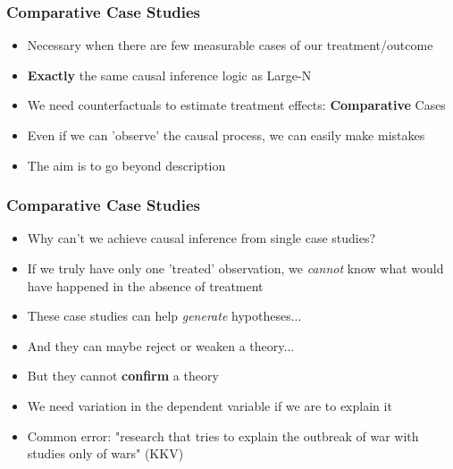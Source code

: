 \documentclass[xcolor=x11names,compress]{beamer}\usepackage[]{graphicx}\usepackage[]{color}
\renewcommand{\(}{\begin{columns}}
\renewcommand{\)}{\end{columns}}
\newcommand{\<}[1]{\begin{column}{#1}}
\renewcommand{\>}{\end{column}}
\begin{document}
\begin{frame}
\frametitle{Comparative Case Studies}
\begin{itemize}
\item Necessary when there are few measurable cases of our treatment/outcome
\pause
\item \textbf{Exactly} the same causal inference logic as Large-N
\pause
\item We need counterfactuals to estimate treatment effects: \textbf{Comparative} Cases
\pause
\item Even if we can 'observe' the causal process, we can easily make mistakes
\pause
\item The aim is to go beyond description
\end{itemize}
\end{frame}

\begin{frame}
\frametitle{Comparative Case Studies}
\begin{itemize}
\item Why can't we achieve causal inference from single case studies?
\pause
\item If we truly have only one 'treated' observation, we \textit{cannot} know what would have happened in the absence of treatment
\pause
\item These case studies can help \textit{generate} hypotheses...
\pause
\item And they can maybe reject or weaken a theory...
\pause
\item But they cannot \textbf{confirm} a theory
\pause
\item We need variation in the dependent variable if we are to explain it
\pause
\item Common error: "research that tries to explain the outbreak of war with studies only of wars" (KKV)
\end{itemize}
\end{frame}
\end{document}
